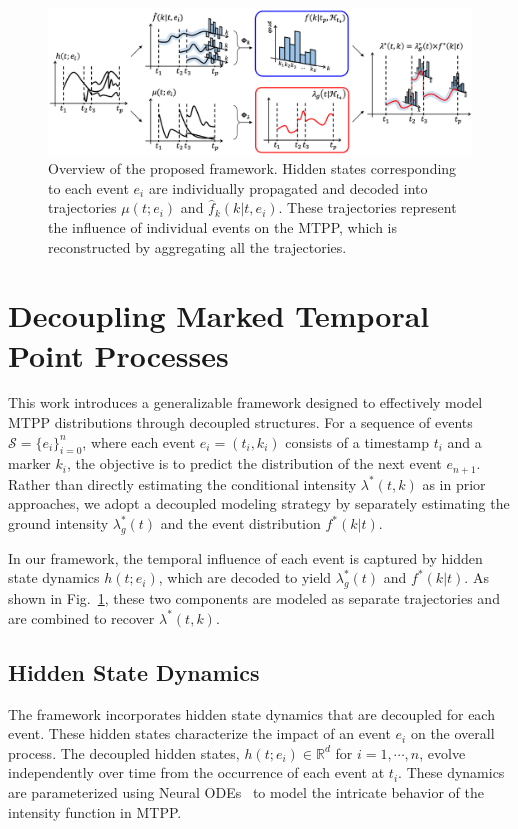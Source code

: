 \begin{figure}[h]
    \centering
    \includegraphics[width=0.95\linewidth]{figure/main_figure_final.png}
    \caption{\small Overview of the proposed framework. Hidden states corresponding to each event $e_i$ are individually propagated and decoded into trajectories $\mu(t;e_i)$ and $\hat{f}_k (k|t, e_i)$. These trajectories represent the influence of individual events on the MTPP, which is reconstructed by aggregating all the trajectories.}
    \label{fig:main}
\end{figure}

\section{Decoupling Marked Temporal Point Processes}
This work introduces a generalizable framework designed to effectively model MTPP distributions through decoupled structures. 
For a sequence of events $\mathcal{S} = \{e_i\}_{i=0} ^n$, where each event $e_i = (t_i, k_i)$ consists of a timestamp $t_i$ and a marker $k_i$, the objective is to predict the distribution of the next event $e_{n+1}$. 
Rather than directly estimating the conditional intensity $\lambda^*(t,k)$ as in prior approaches, we adopt a decoupled modeling strategy by separately estimating the ground intensity $\lambda^*_g(t)$ and the event distribution $f^*(k|t)$.

In our framework, the temporal influence of each event is captured by hidden state dynamics $h(t;e_i)$, which are decoded to yield $\lambda^*_g(t)$ and $f^*(k|t)$. As shown in Fig.~\ref{fig:main}, these two components are modeled as separate trajectories and are combined to recover $\lambda^*(t,k)$.

\subsection{Hidden State Dynamics \label{continuous modeling}}

The framework incorporates hidden state dynamics that are decoupled for each event. These hidden states characterize the impact of an event $e_i$ on the overall process.
The decoupled hidden states, $h(t; e_i) \in \mathbb{R}^d$ for $i = 1, \cdots, n$, evolve independently over time from the occurrence of each event at $t_i$. These dynamics are parameterized using Neural ODEs~\cite{bib:node} to model the intricate behavior of the intensity function in MTPP.

